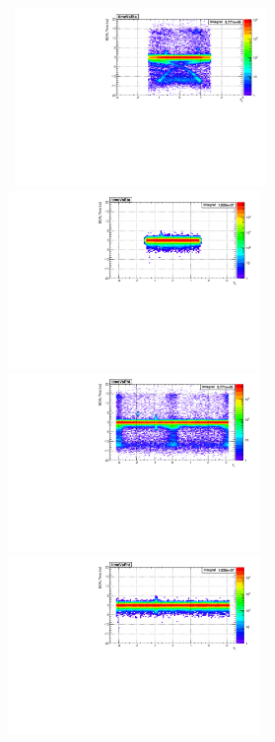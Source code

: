 \vspace{5mm}
\begin{minipage}{0.90\linewidth} 
\begin{center}
\mbox{
\includegraphics[height=0.50\textwidth, width=0.5\textwidth]{THESISPLOTS/SinglePhotonDataSet-TimeVsEtaEB.pdf}
\includegraphics[height=0.50\textwidth, width=0.5\textwidth]
{THESISPLOTS/ZCandidates_TimeVsEta.pdf}}
\mbox{
\includegraphics[height=0.50\textwidth, width=0.5\textwidth]{THESISPLOTS/SinglePhotonDataSet-TimeVsPhiEB.pdf}
\includegraphics[height=0.50\textwidth, width=0.5\textwidth]{THESISPLOTS/ZCandidates_TimeVsPhi.pdf}}

\end{center}
\end{minipage}
